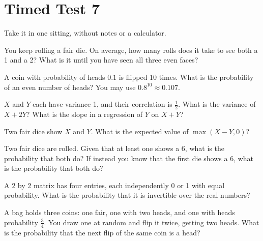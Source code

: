 \chapter{Timed Test 7}\label{ch:iv1:timed-test-7}

\begin{ivtrains}
Take it in one sitting, without notes or a calculator.
\end{ivtrains}


\begin{question}\label{iq:iv1:timed-test-7:1}
You keep rolling a fair die. On average, how many rolls does it take to see both a 1 and a 2? What is it until you have seen all three even faces?
\end{question}

\begin{question}\label{iq:iv1:timed-test-7:2}
A coin with probability of heads $0.1$ is flipped 10 times. What is the probability of an even number of heads? You may use $0.8^{10} \approx 0.107$.
\end{question}

\begin{question}\label{iq:iv1:timed-test-7:3}
$X$ and $Y$ each have variance 1, and their correlation is $\frac12$. What is the variance of $X + 2Y$? What is the slope in a regression of $Y$ on $X + Y$?
\end{question}

\begin{question}\label{iq:iv1:timed-test-7:4}
Two fair dice show $X$ and $Y$. What is the expected value of $\max(X - Y, 0)$?
\end{question}

\begin{question}\label{iq:iv1:timed-test-7:5}
Two fair dice are rolled. Given that at least one shows a 6, what is the probability that both do? If instead you know that the first die shows a 6, what is the probability that both do?
\end{question}

\begin{question}\label{iq:iv1:timed-test-7:6}
A 2 by 2 matrix has four entries, each independently 0 or 1 with equal probability. What is the probability that it is invertible over the real numbers?
\end{question}


\begin{question}\label{iq:iv1:timed-test-7:7}
A bag holds three coins: one fair, one with two heads, and one with heads probability $\frac34$. You draw one at random and flip it twice, getting two heads. What is the probability that the next flip of the same coin is a head?
\end{question}

